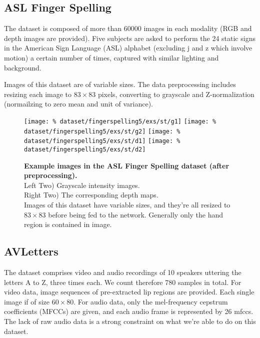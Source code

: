 \subsection{ASL Finger Spelling}

The dataset is composed of more than 60000 images in each modality
(RGB and depth images are provided).
Five subjects are asked to perform the 24 static signs in
the American Sign Language (ASL) alphabet (excluding j and z which involve
motion) a certain number of times, captured with similar lighting
and background.

Images of this dataset are of variable sizes. The data preprocessing
includes resizing each image to $83 \times 83$ pixels,
converting to grayscale and Z-normalization (normailzing to zero mean
and unit of variance).

\begin{figure}[H]
  \centering
  \hfill
  \texttt{[image: \%
    dataset/fingerspelling5/exs/st/g1]}
  \hfill
  \texttt{[image: \%
    dataset/fingerspelling5/exs/st/g2]}
  \hfill
  \texttt{[image: \%
    dataset/fingerspelling5/exs/st/d1]}
  \hfill
  \texttt{[image: \%
    dataset/fingerspelling5/exs/st/d2]}
  \caption{%
    \textbf{Example images in the ASL Finger Spelling dataset
      (after preprocessing).}\\[0.1em]
    Left Two) Grayscale intensity images.\\[0.1em]
    Right Two) The corresponding depth maps.\\[0.1em]
    Images of this dataset have variable sizes, and they're all resized to
      $83 \times 83$ before being fed to the network. Generally only the
      hand region is contained in image.}
  \label{fig:fingerspelling_exs}
\end{figure}

\subsection{AVLetters}

The dataset comprises video and audio recordings of 10 speakers
uttering the letters A to Z, three times each.
We count therefore 780 samples in total. For video data, image sequences
of pre-extracted lip regions are provided.
Each single image if of size $60 \times 80$.
For audio data, only the mel-frequency cepstrum coefficients (MFCCs)
are given, and each audio frame is represented by 26 mfccs.
The lack of raw audio data is a strong constraint on what we're able to do
on this dataset.


